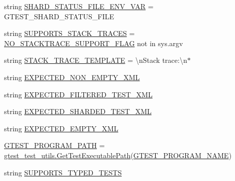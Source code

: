 \begin{DoxyCompactItemize}
\item 
string \mbox{\hyperlink{namespacegoogletest_1_1test_1_1gtest__xml__output__unittest_a7bc6831fcdfcb3171146508b246a1e85}{S\+H\+A\+R\+D\+\_\+\+S\+T\+A\+T\+U\+S\+\_\+\+F\+I\+L\+E\+\_\+\+E\+N\+V\+\_\+\+V\+AR}} = \textquotesingle{}G\+T\+E\+S\+T\+\_\+\+S\+H\+A\+R\+D\+\_\+\+S\+T\+A\+T\+U\+S\+\_\+\+F\+I\+LE\textquotesingle{}
\item 
string \mbox{\hyperlink{namespacegoogletest_1_1test_1_1gtest__xml__output__unittest_a870284a9d5409c24dd60c640a2fecd7f}{S\+U\+P\+P\+O\+R\+T\+S\+\_\+\+S\+T\+A\+C\+K\+\_\+\+T\+R\+A\+C\+ES}} = \mbox{\hyperlink{namespacegoogletest_1_1test_1_1gtest__xml__output__unittest_ad115a905f8692f04e9f5c4305e39584d}{N\+O\+\_\+\+S\+T\+A\+C\+K\+T\+R\+A\+C\+E\+\_\+\+S\+U\+P\+P\+O\+R\+T\+\_\+\+F\+L\+AG}} not in sys.\+argv
\item 
string \mbox{\hyperlink{namespacegoogletest_1_1test_1_1gtest__xml__output__unittest_a682f489e5495ae6d512556a6d430d2d5}{S\+T\+A\+C\+K\+\_\+\+T\+R\+A\+C\+E\+\_\+\+T\+E\+M\+P\+L\+A\+TE}} = \textquotesingle{}\textbackslash{}n\+Stack trace\+:\textbackslash{}n$\ast$\textquotesingle{}
\item 
string \mbox{\hyperlink{namespacegoogletest_1_1test_1_1gtest__xml__output__unittest_ab97164d12da5637af122fcd73476a8da}{E\+X\+P\+E\+C\+T\+E\+D\+\_\+\+N\+O\+N\+\_\+\+E\+M\+P\+T\+Y\+\_\+\+X\+ML}}
\item 
string \mbox{\hyperlink{namespacegoogletest_1_1test_1_1gtest__xml__output__unittest_a1a4d937f8b48fd000ea8c0b2499dba97}{E\+X\+P\+E\+C\+T\+E\+D\+\_\+\+F\+I\+L\+T\+E\+R\+E\+D\+\_\+\+T\+E\+S\+T\+\_\+\+X\+ML}}
\item 
string \mbox{\hyperlink{namespacegoogletest_1_1test_1_1gtest__xml__output__unittest_a780b17e2d2a7cabcd6d56c5d396fcbb9}{E\+X\+P\+E\+C\+T\+E\+D\+\_\+\+S\+H\+A\+R\+D\+E\+D\+\_\+\+T\+E\+S\+T\+\_\+\+X\+ML}}
\item 
string \mbox{\hyperlink{namespacegoogletest_1_1test_1_1gtest__xml__output__unittest_aebac4a19f5c6107de43f4dcefe880c93}{E\+X\+P\+E\+C\+T\+E\+D\+\_\+\+E\+M\+P\+T\+Y\+\_\+\+X\+ML}}
\item 
\mbox{\hyperlink{namespacegoogletest_1_1test_1_1gtest__xml__output__unittest_ae2cfad9d4942e9808117c0e5c1f5ba36}{G\+T\+E\+S\+T\+\_\+\+P\+R\+O\+G\+R\+A\+M\+\_\+\+P\+A\+TH}} = \mbox{\hyperlink{namespacegoogletest_1_1test_1_1gtest__test__utils_ac9af888c702350aac56b154a6af34098}{gtest\+\_\+test\+\_\+utils.\+Get\+Test\+Executable\+Path}}(\mbox{\hyperlink{namespacegoogletest_1_1test_1_1gtest__xml__output__unittest_a7e143d3a4380948bda865cb00eabeb8b}{G\+T\+E\+S\+T\+\_\+\+P\+R\+O\+G\+R\+A\+M\+\_\+\+N\+A\+ME}})
\item 
string \mbox{\hyperlink{namespacegoogletest_1_1test_1_1gtest__xml__output__unittest_a943905e7bcdae182c46b8ab583ddf1cb}{S\+U\+P\+P\+O\+R\+T\+S\+\_\+\+T\+Y\+P\+E\+D\+\_\+\+T\+E\+S\+TS}}
\end{DoxyCompactItemize}



